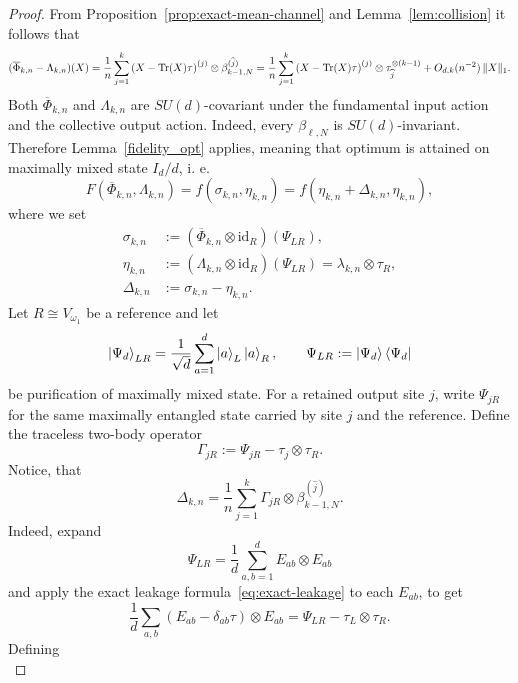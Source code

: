 \documentclass[11pt,letterpaper]{article}
\theoremstyle{plain}
\theoremstyle{plain}
\theoremstyle{plain}
\theoremstyle{plain}
\theoremstyle{plain}
\theoremstyle{plain}
\newcommand{\id}{\mathrm{id}}
\theoremstyle{plain}
\theoremstyle{definition}
\theoremstyle{plain}
\begin{document}
\begin{proof}
    From Proposition~\ref{prop:exact-mean-channel} and Lemma~\ref{lem:collision} it follows that
    \begin{equation}
    \label{eq:exact-leakage}
    (\overline\Phi_{k,n}-\Lambda_{k,n})(X)
    =\frac1n\sum_{j=1}^k
    \left(X-\Tr(X)\tau\right)^{(j)}
    \otimes\beta_{k-1,N}^{(\widehat j)}=\frac1n\sum_{j=1}^k
  \left(X-\Tr(X)\tau\right)^{(j)}
  \otimes\tau^{\otimes(k-1)}_{\widehat j}
  +O_{d,k}(n^{-2})\,\|X\|_1.
    \end{equation}
    Both $\overline\Phi_{k,n}$ and $\Lambda_{k,n}$ are $SU(d)$-covariant under the fundamental input action and the collective output action.  
    Indeed, every $\beta_{\ell,N}$ is $SU(d)$-invariant.  Therefore Lemma~\ref{fidelity_opt} applies,
    meaning that optimum is attained on maximally mixed state $I_d/d$, i. e.
    \[
        F(\overline\Phi_{k,n},\Lambda_{k,n})=f(\sigma_{k,n},\eta_{k,n})=f(\eta_{k,n}+\Delta_{k,n},\eta_{k,n}),
    \]
    where we set
    \begin{align}
    \sigma_{k,n}
    &:=(\overline\Phi_{k,n}\otimes\id_R)(\Psi_{LR}),\\
    \eta_{k,n}
    &:=(\Lambda_{k,n}\otimes\id_R)(\Psi_{LR})
        =\lambda_{k,n}\otimes\tau_R,\\
    \Delta_{k,n}&:=\sigma_{k,n}-\eta_{k,n}.
    \end{align}
    Let $R\cong V_{\omega_1}$ be a reference and let
    \[
    \ket{\Psi_d}_{LR}=\frac1{\sqrt d}\sum_{a=1}^d\ket a_L\ket a_R,
    \qquad
    \Psi_{LR}:=\ket{\Psi_d}\bra{\Psi_d}
    \]
    be purification of maximally mixed state.
    For a retained output site $j$, write $\Psi_{jR}$ for the same maximally entangled state carried by site $j$ and the reference.
    Define the traceless two-body operator
    \begin{equation}
    \label{eq:Gamma}
    \Gamma_{jR}:=\Psi_{jR}-\tau_j\otimes\tau_R.
    \end{equation}
    Notice, that
    \begin{equation}
    \label{eq:exact-choi-difference}
    \Delta_{k,n}
    =\frac1n\sum_{j=1}^k
    \Gamma_{jR}\otimes\beta_{k-1,N}^{(\widehat j)}.
    \end{equation}
    Indeed, expand
\[
  \Psi_{LR}=\frac1d\sum_{a,b=1}^d E_{ab}\otimes E_{ab}
\]
and apply the exact leakage formula~\eqref{eq:exact-leakage} to each $E_{ab}$, to get
\[
  \frac1d\sum_{a,b}
  (E_{ab}-\delta_{ab}\tau)\otimes E_{ab}
  =\Psi_{LR}-\tau_L\otimes\tau_R.
\]
Defining 
\begin{equation}

\end{equation}
\end{proof}
\end{document}
